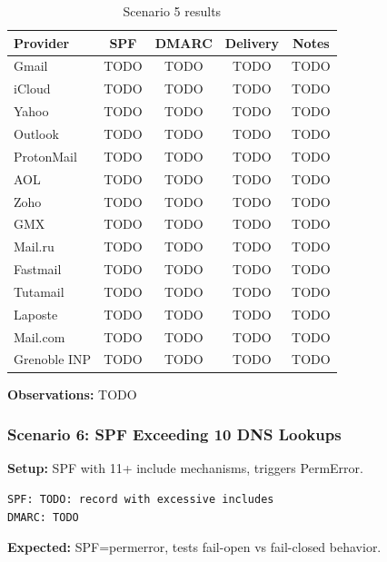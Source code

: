 \documentclass[11pt,a4paper]{article}
\begin{document}
\begin{table}[h]
\centering
\small
\begin{tabular}{lcccc}
\toprule
\textbf{Provider} & \textbf{SPF} & \textbf{DMARC} & \textbf{Delivery} & \textbf{Notes} \\
\midrule
Gmail & TODO & TODO & TODO & TODO \\
iCloud & TODO & TODO & TODO & TODO \\
Yahoo & TODO & TODO & TODO & TODO \\
Outlook & TODO & TODO & TODO & TODO \\
ProtonMail & TODO & TODO & TODO & TODO \\
AOL & TODO & TODO & TODO & TODO \\
Zoho & TODO & TODO & TODO & TODO \\
GMX & TODO & TODO & TODO & TODO \\
Mail.ru & TODO & TODO & TODO & TODO \\
Fastmail & TODO & TODO & TODO & TODO \\
Tutamail & TODO & TODO & TODO & TODO \\
Laposte & TODO & TODO & TODO & TODO \\
Mail.com & TODO & TODO & TODO & TODO \\
Grenoble INP & TODO & TODO & TODO & TODO \\
\bottomrule
\end{tabular}
\caption{Scenario 5 results}
\end{table}

\textbf{Observations:} TODO


\subsubsection{Scenario 6: SPF Exceeding 10 DNS Lookups}

\textbf{Setup:} SPF with 11+ include mechanisms, triggers PermError.

\begin{lstlisting}
SPF: TODO: record with excessive includes
DMARC: TODO
\end{lstlisting}

\textbf{Expected:} SPF=permerror, tests fail-open vs fail-closed behavior.
\end{document}
